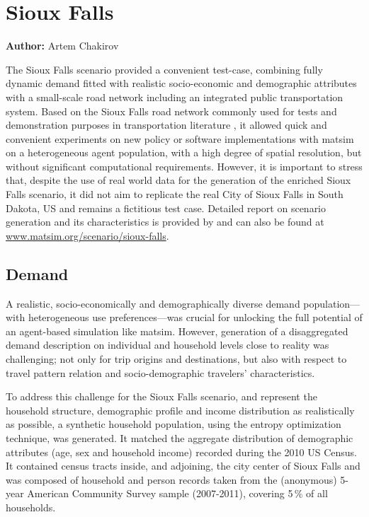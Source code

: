 \chapter{Sioux Falls}
\label{ch:siouxfalls}
\hfill \textbf{Author:} Artem Chakirov


The Sioux Falls scenario provided a convenient test-case, combining fully dynamic demand fitted with realistic socio-economic and demographic attributes with a small-scale road network including an integrated public transportation system. Based on the Sioux Falls road network commonly used for tests and demonstration purposes in transportation literature \citep[][]{BarGera_TNTP_Webpage_2013}, it allowed quick and convenient experiments on new policy or software implementations with \gls{matsim} on a heterogeneous agent population, with a high degree of spatial resolution, but without significant computational requirements. However, it is important to stress that, despite the use of real world data for the generation of the enriched Sioux Falls scenario, it did not aim to replicate the real City of Sioux Falls in South Dakota, US and remains a fictitious test case. Detailed report on scenario generation and its characteristics is provided by \citet[][]{ChakirovFourie_TechRep_FCL_2014} and can also be found at \url{www.matsim.org/scenario/sioux-falls}. 

\section{Demand}
A realistic, socio-economically and demographically diverse demand population---with  heterogeneous use preferences---was crucial for unlocking the full potential of an agent-based simulation like \gls{matsim}. However, generation of a disaggregated demand description on individual and household levels close to reality was challenging; not only for trip origins and destinations, but also with respect to travel pattern relation and socio-demographic travelers' characteristics.

To address this challenge for the Sioux Falls scenario, and represent the household structure, demographic profile and income distribution as realistically as possible, a synthetic household population, using the \citet[][]{BarGeraEtAl_TRB_2009} entropy optimization technique, was generated. It matched the aggregate distribution of demographic attributes (age, sex and household income) recorded during the 2010 US Census. It contained census tracts inside, and adjoining, the city center of Sioux Falls and was composed of household and person records taken from the (anonymous) 5-year American Community Survey sample (2007-2011), covering 5\,\% of all households.

